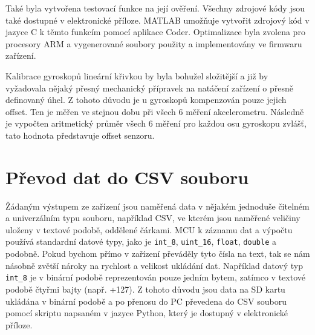 Také byla vytvořena testovací funkce na její ověření. Všechny zdrojové kódy jsou také dostupné v elektronické příloze. MATLAB umožňuje vytvořit zdrojový kód v jazyce C k těmto funkcím pomocí aplikace Coder. Optimalizace byla zvolena pro procesory ARM a vygenerované soubory použity a implementovány ve firmwaru zařízení. 

Kalibrace gyroskopů lineární křivkou by byla bohužel složitější a již by vyžadovala nějaký přesný mechanický přípravek na natáčení zařízení o přesně definovaný úhel. Z tohoto důvodu je u gyroskopů kompenzován pouze jejich offset. Ten je měřen ve stejnou dobu při všech 6 měření akcelerometru. Následně je vypočten aritmetický průměr všech 6 měření pro každou osu gyroskopu zvlášť, tato hodnota představuje offset senzoru.

\section{Převod dat do CSV souboru}
Žádaným výstupem ze zařízení jsou naměřená data v nějakém jednoduše čitelném a univerzálním typu souboru, například \ac{CSV}, ve kterém jsou naměřené veličiny uloženy v textové podobě, oddělené čárkami. \ac{MCU} k záznamu dat a výpočtu používá standardní datové typy, jako je \texttt{int\_8}, \texttt{uint\_16}, \texttt{float}, \texttt{double} a podobně. Pokud bychom přímo v zařízení převáděly tyto čísla na text, tak se nám násobně zvětší nároky na rychlost a velikost ukládání dat. Například datový typ \texttt{int\_8} je v binární podobě reprezentován pouze jedním bytem, zatímco v textové podobě čtyřmi bajty (např. +127). Z tohoto důvodu jsou data na SD kartu ukládána v binární podobě a po přenosu do PC převedena do \ac{CSV} souboru pomocí skriptu napsaném v jazyce Python, který je dostupný v elektronické příloze.






